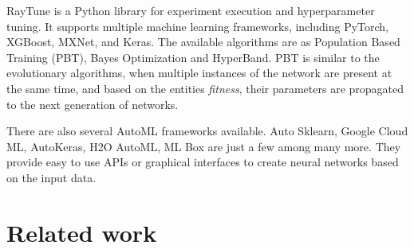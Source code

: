 \documentclass[conference]{IEEEtran}
\begin{document}
RayTune is a Python library for experiment execution and hyperparameter tuning. It supports multiple machine learning frameworks, including PyTorch, XGBoost, MXNet, and Keras. The available algorithms are as Population Based Training (PBT), Bayes Optimization and HyperBand. PBT is similar to the evolutionary algorithms, when multiple instances of the network are present at the same time, and based on the entities \emph{fitness}, their parameters are propagated to the next generation of networks. \cite{jaderberg2017population}

There are also several AutoML frameworks available. Auto Sklearn, Google Cloud ML, AutoKeras, H2O AutoML, ML Box are just a few among many more. They provide easy to use APIs or graphical interfaces to create neural networks based on the input data.


\section{Related work}
\end{document}
